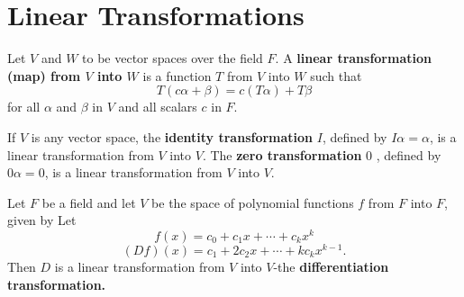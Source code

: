 \documentclass[main.tex]{subfiles}
\begin{document}
\section{Linear Transformations}
\begin{definition}
Let $V$ and $W$ to be vector spaces over the field $F$. A \textbf{linear transformation (map) from $V$ into $W$} is a function $T$ from $V$ into $W$ such that 
\begin{equation}
    T(c\alpha + \beta) = c(T\alpha) + T\beta
\end{equation}
for all $\alpha$ and $\beta$ in $V$ and all scalars $c$ in $F$. 
\end{definition}

\begin{example}\label{identity_transformation}\label{zero_transformation}
If $V$ is any vector space, the \textbf{identity transformation} $I$, defined by $I \alpha=\alpha$, is a linear transformation from $V$ into $V$. The \textbf{zero transformation} 0 , defined by $0 \alpha=0$, is a linear transformation from $V$ into $V$.
\end{example}
\begin{example}\label{differentiation_transformation}
Let $F$ be a field and let $V$ be the space of polynomial functions $f$ from $F$ into $F$, given by
Let
$$
f(x)=c_0+c_1 x+\cdots+c_k x^k
$$
$$
(D f)(x)=c_1+2 c_2 x+\cdots+k c_k x^{k-1} .
$$
Then $D$ is a linear transformation from $V$ into $V$-the \textbf{differentiation transformation.}
\end{example}
\end{document}
